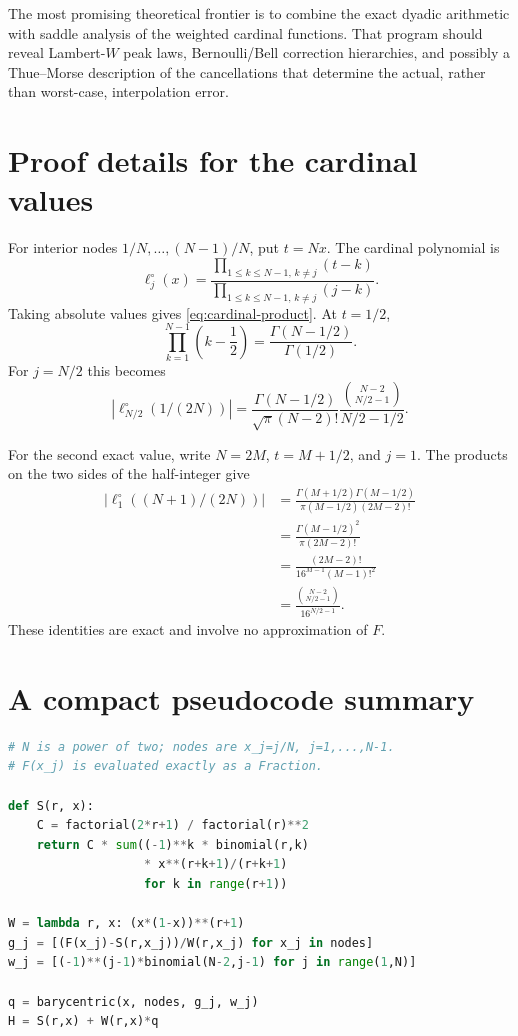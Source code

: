 \documentclass[11pt,oneside]{article}
\theoremstyle{definition}
\theoremstyle{remark}
\newcommand{\abs}[1]{\left\lvert #1\right\rvert}
\begin{document}
The most promising theoretical frontier is to combine the exact dyadic arithmetic with saddle analysis of the weighted cardinal functions.  That program should reveal Lambert-$W$ peak laws, Bernoulli/Bell correction hierarchies, and possibly a Thue--Morse description of the cancellations that determine the actual, rather than worst-case, interpolation error.

\appendix

\section{Proof details for the cardinal values}
\label{app:cardinal}

For interior nodes $1/N,\dots,(N-1)/N$, put $t=Nx$.  The cardinal polynomial is
\begin{equation}
 \ell_j^{\circ}(x)=
 \frac{\prod_{1\le k\le N-1,\,k\ne j}(t-k)}
 {\prod_{1\le k\le N-1,\,k\ne j}(j-k)}.
\end{equation}
Taking absolute values gives \eqref{eq:cardinal-product}.  At $t=1/2$,
\begin{equation}
 \prod_{k=1}^{N-1}\left(k-\frac12\right)
 =\frac{\Gamma(N-1/2)}{\Gamma(1/2)}.
\end{equation}
For $j=N/2$ this becomes
\begin{equation}
 \abs{\ell_{N/2}^{\circ}(1/(2N))}
 =\frac{\Gamma(N-1/2)}{\sqrt\pi(N-2)!}
 \frac{\binom{N-2}{N/2-1}}{N/2-1/2}.
\end{equation}

For the second exact value, write $N=2M$, $t=M+1/2$, and $j=1$.  The products on the two sides of the half-integer give
\begin{align}
 \abs{\ell_1^{\circ}((N+1)/(2N))}
 &=\frac{\Gamma(M+1/2)\Gamma(M-1/2)}
 {\pi(M-1/2)(2M-2)!}\\
 &=\frac{\Gamma(M-1/2)^2}{\pi(2M-2)!}\\
 &=\frac{(2M-2)!}{16^{M-1}(M-1)!^2}\\
 &=\frac{\binom{N-2}{N/2-1}}{16^{N/2-1}}.
\end{align}
These identities are exact and involve no approximation of $F$.

\section{A compact pseudocode summary}
\label{app:pseudocode}

\begin{lstlisting}[language=Python,caption={Endpoint-jet interpolation in barycentric form.}]
# N is a power of two; nodes are x_j=j/N, j=1,...,N-1.
# F(x_j) is evaluated exactly as a Fraction.

def S(r, x):
    C = factorial(2*r+1) / factorial(r)**2
    return C * sum((-1)**k * binomial(r,k)
                   * x**(r+k+1)/(r+k+1)
                   for k in range(r+1))

W = lambda r, x: (x*(1-x))**(r+1)
g_j = [(F(x_j)-S(r,x_j))/W(r,x_j) for x_j in nodes]
w_j = [(-1)**(j-1)*binomial(N-2,j-1) for j in range(1,N)]

q = barycentric(x, nodes, g_j, w_j)
H = S(r,x) + W(r,x)*q
\end{lstlisting}
\end{document}
